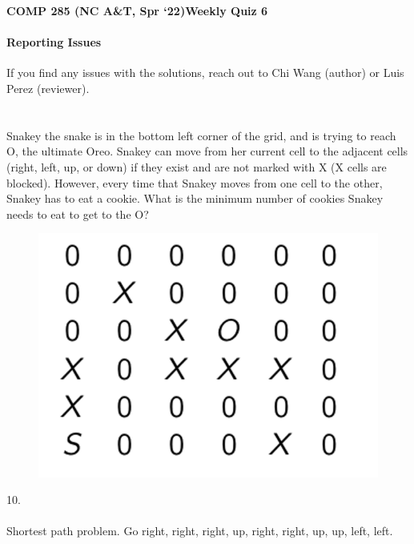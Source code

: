 \documentclass [12pt]{article}
\begin{document}
 

{\LARGE \textbf {COMP 285 (NC A\&T, Spr `22)}\hfill \textbf {Weekly Quiz 6} } 

\begin{Instruction}

\paragraph{Reporting Issues} If you find any issues with the solutions, reach out to Chi Wang (author) or Luis Perez (reviewer).

\end{Instruction}


\section{} Snakey the snake is in the bottom left corner of the grid, and is trying to reach O, the ultimate Oreo. 
Snakey can move from her current cell to the adjacent cells (right, left, up, or down) if they exist and are not marked with X (X cells are blocked). However, every time that Snakey moves from one cell to the other, Snakey has to eat a cookie. What is the minimum number of cookies Snakey needs to eat to get to the O? 

\begin{figure}[H]
    \centering
    \includegraphics[scale=0.5]{6.png} 
    \label{fig:my_label}
\end{figure}

\begin{Solution}
10.
\paragraph{}
Shortest path problem. Go right, right, right, up, right, right, up, up, left, left.
\end{Solution}
\end{document}
